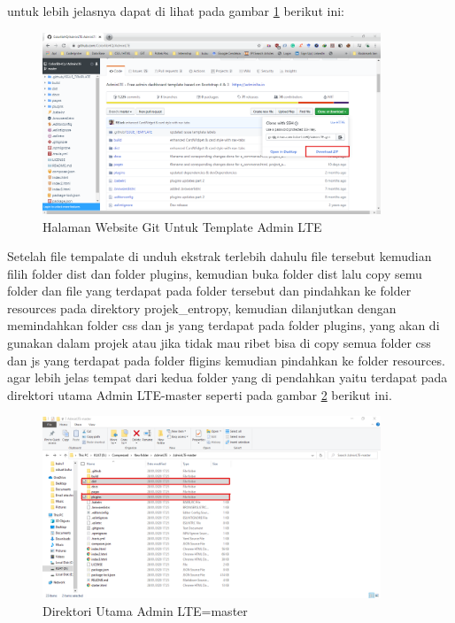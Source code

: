 untuk lebih jelasnya dapat di lihat pada gambar \ref{tmp1} berikut ini:

\begin{figure}[!htbp]
	\centerline{\includegraphics[width=0.90\textwidth]{figures/tmp/1.png}}
	\caption{Halaman Website Git Untuk Template Admin LTE}
	\label{tmp1}
\end{figure}
\pagebreak

Setelah file tempalate di unduh ekstrak terlebih dahulu file tersebut kemudian filih folder dist dan folder plugins, kemudian buka folder dist lalu copy semu folder dan file yang terdapat pada folder tersebut dan pindahkan ke folder resources pada direktory projek\_entropy, kemudian dilanjutkan dengan memindahkan folder css dan js yang terdapat pada folder plugins, yang akan di gunakan dalam projek atau jika tidak mau ribet bisa di copy semua folder css dan js yang terdapat pada folder fligins kemudian pindahkan ke folder resources. agar lebih jelas tempat dari kedua folder yang di pendahkan yaitu terdapat pada direktori utama Admin LTE-master seperti pada gambar \ref{tmp2} berikut ini.

\begin{figure}[!htbp]
	\centerline{\includegraphics[width=0.90\textwidth]{figures/tmp/2.png}}
	\caption{Direktori Utama Admin LTE=master}
	\label{tmp2}
\end{figure}

